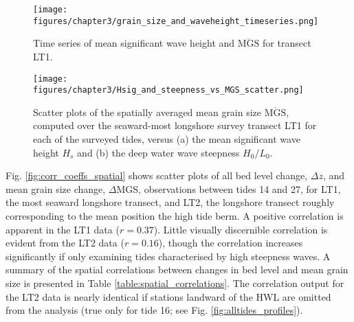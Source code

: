 \documentclass[preprint,12pt,authoryear]{elsarticle}
\begin{document}
\begin{figure}[tbp] %
	\begin{center}
		\texttt{[image: figures/chapter3/grain\_size\_and\_waveheight\_timeseries.png]}
		\caption[Time series of mean significant wave height and mean surficial grian size]{Time series of mean significant wave height and $\overline{\mathrm{MGS}}$ for transect LT1.\label{fig:hsig_mgs}}
	\end{center}
\end{figure}

\begin{figure}[tbp] %
	\begin{center}
		\texttt{[image: figures/chapter3/Hsig\_and\_steepness\_vs\_MGS\_scatter.png]}
		\caption[Mean surfical grain size versus significant wave height, wave steepness]{Scatter plots of the spatially averaged mean grain size $\overline{\mathrm{MGS}}$, computed over the seaward-most longshore survey transect LT1 for each of the surveyed tides, versus (a) the mean significant wave height $H_s$ and (b) the deep water wave steepness $H_0/L_0$. \label{fig:hsig_steepness_mgs_scatter}}
	\end{center}
\end{figure}

Fig. \ref{fig:corr_coeffs_spatial} shows scatter plots of all bed level change, $\Delta z$, and mean grain size change, $\Delta$MGS, observations between tides 14 and 27, for LT1, the most seaward longshore transect, and LT2, the longshore transect roughly corresponding to the mean position the high tide berm. A positive correlation is apparent in the LT1 data ($r=0.37$). Little visually discernible correlation is evident from the LT2 data ($r=0.16$), though the correlation increases significantly if only examining tides characterised by high steepness waves. A summary of the spatial correlations between changes in bed level and mean grain size is presented in Table \ref{table:spatial_correlations}. The correlation output for the LT2 data is nearly identical if stations landward of the HWL are omitted from the analysis (true only for tide 16; see Fig. \ref{fig:alltides_profiles}).
\end{document}
